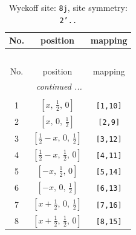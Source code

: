 \documentclass[fleqn,8pt]{jsarticle}
\begin{document}
\begin{longtable}{ccc}
\caption{Wyckoff site: {\tt 8j}, site symmetry: {\tt 2'..}}
 \\
 \hline \hline
No. & position & mapping \\ \hline \endfirsthead

\multicolumn{2}{l}{\tablename\ \thetable{}} \\
 \hline \hline
No. & position & mapping \\ \hline \endhead

 \hline \hline
\multicolumn{2}{r}{\footnotesize\it continued ...} \\ \endfoot

 \hline \hline
\multicolumn{2}{r}{} \\ \endlastfoot

1 & $\left[ x,\, \frac{1}{2},\, 0 \right]$ & {\tt [1,10]} \\ \hline
2 & $\left[ x,\, 0,\, \frac{1}{2} \right]$ & {\tt [2,9]} \\ \hline
3 & $\left[ \frac{1}{2} - x,\, 0,\, \frac{1}{2} \right]$ & {\tt [3,12]} \\ \hline
4 & $\left[ \frac{1}{2} - x,\, \frac{1}{2},\, 0 \right]$ & {\tt [4,11]} \\ \hline
5 & $\left[ - x,\, \frac{1}{2},\, 0 \right]$ & {\tt [5,14]} \\ \hline
6 & $\left[ - x,\, 0,\, \frac{1}{2} \right]$ & {\tt [6,13]} \\ \hline
7 & $\left[ x + \frac{1}{2},\, 0,\, \frac{1}{2} \right]$ & {\tt [7,16]} \\ \hline
8 & $\left[ x + \frac{1}{2},\, \frac{1}{2},\, 0 \right]$ & {\tt [8,15]} \\
\end{longtable}
\renewcommand{\arraystretch}{1.2}
\end{document}
